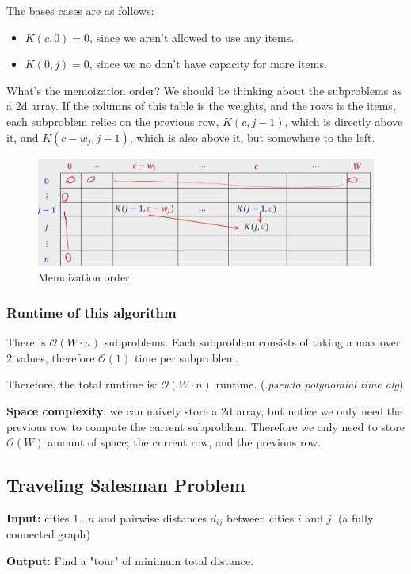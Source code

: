 \documentclass[12pt]{article}
\renewcommand{\O}{\mathcal{O}}
\begin{document}
The bases cases are as follows:
\begin{itemize}
    \item $K(c, 0) = 0$, since we aren't allowed to use any items.
    \item $K(0, j) = 0$, since we no don't have capacity for more items.
\end{itemize}
What's the memoization order? We should be thinking about the subproblems as a 2d array. If the columns of this table is the weights, and the rows is the items, each subproblem relies on the previous row, $K(c, j - 1)$, which is directly above it, and $K(c - w_j, j - 1)$, which is also above it, but somewhere to the left.
\begin{figure}[H]
    \centering
    \includegraphics[scale=0.3]{images/knapsack-without-repetition-memoization.png}
    \caption{Memoization order}
\end{figure}
\subsubsection{Runtime of this algorithm}
There is $\O(W\cdot n)$ subproblems. Each subproblem consists of taking a max over 2 values, therefore $\O(1)$ time per subproblem.

Therefore, the total runtime is: $\O(W\cdot n)$ runtime. (.\emph{pseudo polynomial time alg})

\textbf{Space complexity}: we can naively store a 2d array, but notice we only need the previous row to compute the current subproblem. Therefore we only need to store $\O(W)$ amount of space; the current row, and the previous row.

\subsection{Traveling Salesman Problem}
\textbf{Input: } cities $1\dots n$ and pairwise distances $d_{ij}$ between cities $i$ and $j$. (a fully connected graph)

\textbf{Output: } Find a "tour" of minimum total distance.
\end{document}
